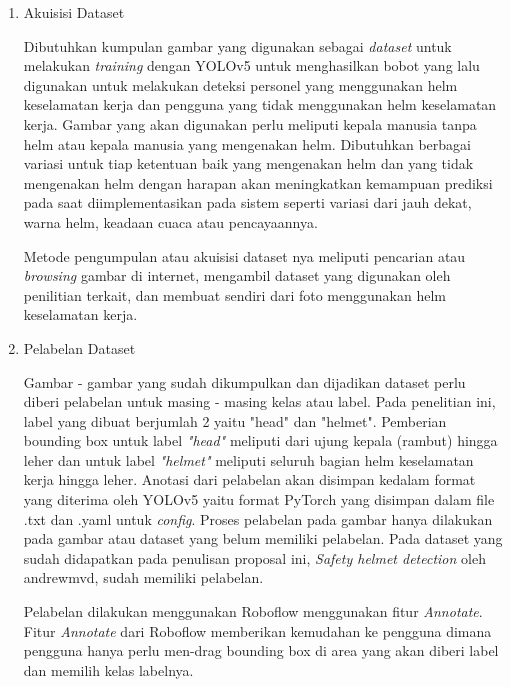 \begin{enumerate}
  \item Akuisisi Dataset
  \par Dibutuhkan kumpulan gambar yang digunakan sebagai \emph{dataset} untuk melakukan \emph{training} dengan YOLOv5 untuk menghasilkan bobot yang lalu digunakan untuk melakukan 
  deteksi personel yang menggunakan helm keselamatan kerja dan pengguna yang tidak menggunakan helm keselamatan kerja. Gambar yang akan digunakan perlu meliputi kepala manusia tanpa helm atau
  kepala manusia yang mengenakan helm. Dibutuhkan berbagai variasi untuk tiap ketentuan baik yang mengenakan helm dan yang tidak mengenakan helm dengan harapan akan meningkatkan kemampuan
  prediksi pada saat diimplementasikan pada sistem seperti variasi dari jauh dekat, warna helm, keadaan cuaca atau pencayaannya.
  \par Metode pengumpulan atau akuisisi dataset nya meliputi pencarian atau \emph{browsing} gambar di internet, mengambil dataset yang digunakan oleh penilitian terkait, dan membuat sendiri dari foto
  menggunakan helm keselamatan kerja.

  \item Pelabelan Dataset
  \par Gambar - gambar yang sudah dikumpulkan dan dijadikan dataset perlu diberi pelabelan untuk masing - masing kelas atau label. Pada penelitian ini, label yang dibuat berjumlah 2 yaitu 
  "head" dan "helmet". Pemberian bounding box untuk label \emph{"head"} meliputi dari ujung kepala (rambut) hingga leher dan untuk label \emph{"helmet"} meliputi seluruh bagian helm 
  keselamatan kerja hingga leher. Anotasi dari pelabelan akan disimpan kedalam format yang diterima oleh YOLOv5 yaitu format PyTorch yang disimpan dalam file .txt dan .yaml untuk \emph{config}.
  Proses pelabelan pada gambar hanya dilakukan pada gambar atau dataset yang belum memiliki pelabelan. Pada dataset yang sudah didapatkan pada penulisan proposal ini, \emph{Safety helmet detection} oleh andrewmvd, sudah memiliki
  pelabelan.
  \par Pelabelan dilakukan menggunakan Roboflow menggunakan fitur \emph{Annotate}. Fitur \emph{Annotate} dari Roboflow memberikan kemudahan ke pengguna dimana pengguna hanya perlu men-drag bounding
  box di area yang akan diberi label dan memilih kelas labelnya. 
  

\end{enumerate}
